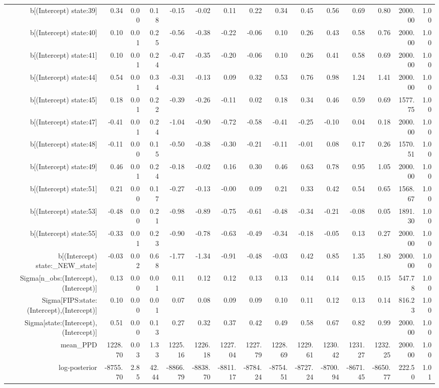 \begin{table}[ht]
\begin{tabular}{rrrrrrrrrrrrrrr}
  b[(Intercept) state:39] & 0.34 & 0.00 & 0.18 & -0.15 & -0.02 & 0.11 & 0.22 & 0.34 & 0.45 & 0.56 & 0.69 & 0.80 & 2000.00 & 1.00 \\ 
  b[(Intercept) state:40] & 0.10 & 0.01 & 0.25 & -0.56 & -0.38 & -0.22 & -0.06 & 0.10 & 0.26 & 0.43 & 0.58 & 0.76 & 2000.00 & 1.00 \\ 
  b[(Intercept) state:41] & 0.10 & 0.01 & 0.24 & -0.47 & -0.35 & -0.20 & -0.06 & 0.10 & 0.26 & 0.41 & 0.58 & 0.69 & 2000.00 & 1.00 \\ 
  b[(Intercept) state:44] & 0.54 & 0.01 & 0.34 & -0.31 & -0.13 & 0.09 & 0.32 & 0.53 & 0.76 & 0.98 & 1.24 & 1.41 & 2000.00 & 1.00 \\ 
  b[(Intercept) state:45] & 0.18 & 0.01 & 0.22 & -0.39 & -0.26 & -0.11 & 0.02 & 0.18 & 0.34 & 0.46 & 0.59 & 0.69 & 1577.75 & 1.00 \\ 
  b[(Intercept) state:47] & -0.41 & 0.01 & 0.24 & -1.04 & -0.90 & -0.72 & -0.58 & -0.41 & -0.25 & -0.10 & 0.04 & 0.18 & 2000.00 & 1.00 \\ 
  b[(Intercept) state:48] & -0.11 & 0.00 & 0.15 & -0.50 & -0.38 & -0.30 & -0.21 & -0.11 & -0.01 & 0.08 & 0.17 & 0.26 & 1570.51 & 1.00 \\ 
  b[(Intercept) state:49] & 0.46 & 0.01 & 0.24 & -0.18 & -0.02 & 0.16 & 0.30 & 0.46 & 0.63 & 0.78 & 0.95 & 1.05 & 2000.00 & 1.00 \\ 
  b[(Intercept) state:51] & 0.21 & 0.00 & 0.17 & -0.27 & -0.13 & -0.00 & 0.09 & 0.21 & 0.33 & 0.42 & 0.54 & 0.65 & 1568.67 & 1.00 \\ 
  b[(Intercept) state:53] & -0.48 & 0.00 & 0.21 & -0.98 & -0.89 & -0.75 & -0.61 & -0.48 & -0.34 & -0.21 & -0.08 & 0.05 & 1891.30 & 1.00 \\ 
  b[(Intercept) state:55] & -0.33 & 0.01 & 0.23 & -0.90 & -0.78 & -0.63 & -0.49 & -0.34 & -0.18 & -0.05 & 0.13 & 0.27 & 2000.00 & 1.00 \\ 
  b[(Intercept) state:\_NEW\_state] & -0.03 & 0.02 & 0.68 & -1.77 & -1.34 & -0.91 & -0.48 & -0.03 & 0.42 & 0.85 & 1.35 & 1.80 & 2000.00 & 1.00 \\ 
  Sigma[n\_obs:(Intercept),(Intercept)] & 0.13 & 0.00 & 0.01 & 0.11 & 0.12 & 0.12 & 0.13 & 0.13 & 0.14 & 0.14 & 0.15 & 0.15 & 547.78 & 1.00 \\ 
  Sigma[FIPS:state:(Intercept),(Intercept)] & 0.10 & 0.00 & 0.01 & 0.07 & 0.08 & 0.09 & 0.09 & 0.10 & 0.11 & 0.12 & 0.13 & 0.14 & 816.23 & 1.00 \\ 
  Sigma[state:(Intercept),(Intercept)] & 0.51 & 0.00 & 0.13 & 0.27 & 0.32 & 0.37 & 0.42 & 0.49 & 0.58 & 0.67 & 0.82 & 0.99 & 2000.00 & 1.00 \\ 
  mean\_PPD & 1228.70 & 0.03 & 1.33 & 1225.16 & 1226.18 & 1227.04 & 1227.79 & 1228.69 & 1229.61 & 1230.42 & 1231.27 & 1232.25 & 2000.00 & 1.00 \\ 
  log-posterior & -8755.70 & 2.85 & 42.44 & -8866.79 & -8838.70 & -8811.17 & -8784.24 & -8754.51 & -8727.24 & -8700.94 & -8671.45 & -8650.77 & 222.50 & 1.01 \\ 
   \hline
\end{tabular}
\end{table}
